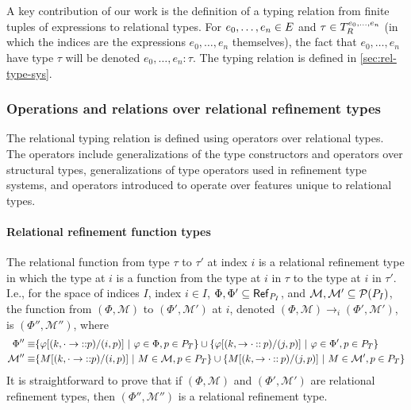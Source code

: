 A key contribution of our work is the definition of a typing relation
from finite tuples of expressions to relational types.
%
For $e_0, \ldots, e_n \in E$ and
$\tau \in T_{R}^{e_0, \ldots, e_n}$ (in which the indices are the
expressions $e_0, \ldots, e_n$ themselves), the fact that
$e_0, \ldots, e_n$ have type $\tau$ will be denoted
$e_0, \ldots, e_n : \tau$.
%
The typing relation is defined in \autoref{sec:rel-type-sys}.

\subsubsection{Operations and relations over relational refinement types}
\label{sec:rel-type-ops}
The relational typing relation is defined using operators over
relational types.
%
The operators include generalizations of the type constructors and
operators over structural types, generalizations of type operators
used in refinement type systems, and operators introduced to operate
over features unique to relational types.

\paragraph{Relational refinement function types}
%
The relational function from type $\tau$ to $\tau'$ at index $i$ is a
relational refinement type in which the type at $i$ is a function from
the type at $i$ in $\tau$ to the type at $i$ in $\tau'$.
%
I.e., for the space of indices $I$, index $i \in I$, %
$\Phi, \Phi' \subseteq \mathsf{Ref}_{ P_{I} }$, and %
$\mathcal{M}, \mathcal{M}' \subseteq \mathcal{P}(P_{I})$, the function
from $(\Phi, \mathcal{M})$ to $(\Phi', \mathcal{M}')$ at $i$, denoted
$(\Phi, \mathcal{M}) \to_i (\Phi', \mathcal{M}')$, is
$(\Phi'', \mathcal{M}'')$, where %
\begin{align*}
  \Phi'' \equiv & %
  \setformer{ \replace{ \varphi }{ (i, p) }{ (k, \typaramfield \cons p) } }{ %
    \varphi \in \Phi, p \in \typos } \union %
  \setformer{ \replace{ \varphi }{ (j, p) }{(k, \tyresfield \cons p)} }{ %
                  \varphi \in \Phi', p \in \typos } \\
  \mathcal{M}'' \equiv & %
  \setformer{ \replace{ M }{ (i, p) }{ (k, \typaramfield \cons p) } }{ %
  M \in \mathcal{M}, p \in \typos } \union
  \setformer{ \replace{ M }{ (j, p) }{ (k, \tyresfield \cons p) } }{ %
  M \in \mathcal{M}', p \in \typos }
\end{align*}
It is straightforward to prove that if $(\Phi, \mathcal{M})$ and
$(\Phi', \mathcal{M}')$ are relational refinement types, then
$(\Phi'', \mathcal{M}'')$ is a relational refinement type.

